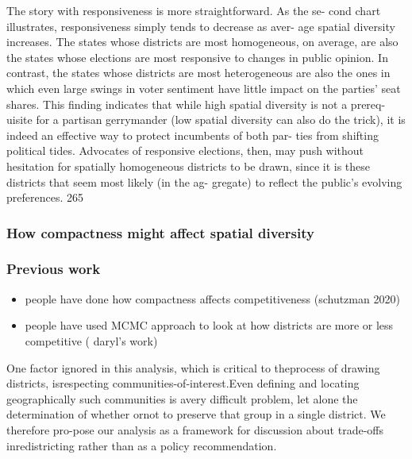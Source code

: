 \documentclass[]{article}
\providecommand{\tightlist}{%
  \setlength{\itemsep}{0pt}\setlength{\parskip}{0pt}}
\begin{document}
The story with responsiveness is more straightforward. As the se- cond
chart illustrates, responsiveness simply tends to decrease as aver- age
spatial diversity increases. The states whose districts are most
homogeneous, on average, are also the states whose elections are most
responsive to changes in public opinion. In contrast, the states whose
districts are most heterogeneous are also the ones in which even large
swings in voter sentiment have little impact on the parties' seat
shares. This finding indicates that while high spatial diversity is not
a prereq- uisite for a partisan gerrymander (low spatial diversity can
also do the trick), it is indeed an effective way to protect incumbents
of both par- ties from shifting political tides. Advocates of responsive
elections, then, may push without hesitation for spatially homogeneous
districts to be drawn, since it is these districts that seem most likely
(in the ag- gregate) to reflect the public's evolving preferences. 265

\cite{steph2012}

\hypertarget{how-compactness-might-affect-spatial-diversity}{%
\subsubsection{How compactness might affect spatial
diversity}\label{how-compactness-might-affect-spatial-diversity}}

\hypertarget{previous-work}{%
\subsubsection{Previous work}\label{previous-work}}

\begin{itemize}
\tightlist
\item
  people have done how compactness affects competitiveness (schutzman
  2020)
\item
  people have used MCMC approach to look at how districts are more or
  less competitive ( daryl's work)
\end{itemize}

One factor ignored in this analysis, which is critical to theprocess of
drawing districts, isrespecting communities-of-interest.Even defining
and locating geographically such communities is avery difficult problem,
let alone the determination of whether ornot to preserve that group in a
single district. We therefore pro-pose our analysis as a framework for
discussion about trade-offs inredistricting rather than as a policy
recommendation.
\end{document}

